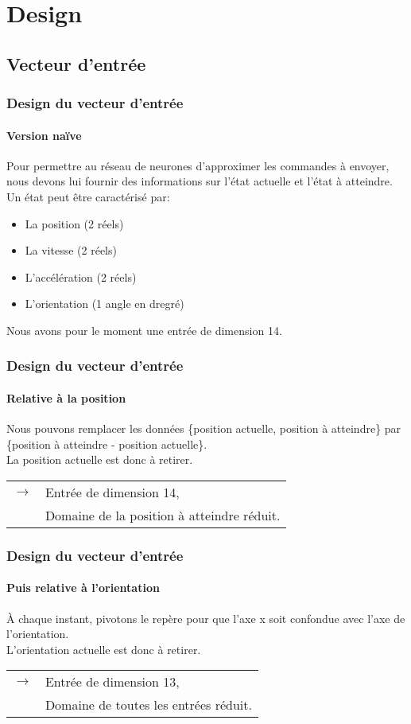 \section{Design}
\subsection{Vecteur d'entrée}

\begin{frame}
 \frametitle{Design du vecteur d'entrée}
 \framesubtitle{Version naïve}
 Pour permettre au réseau de neurones d'approximer les commandes à envoyer, nous devons lui fournir des informations sur l'état actuelle et l'état à atteindre.\\
 \vspace{1cm}
 Un état peut être caractérisé par:
 \begin{itemize}
  \item La position (2 réels)
  \item La vitesse (2 réels)
  \item L'accélération (2 réels)
  \item L'orientation (1 angle en dregré)
 \end{itemize}
 Nous avons pour le moment une entrée de dimension 14.
\end{frame}

\begin{frame}
 \frametitle{Design du vecteur d'entrée}
 \framesubtitle{Relative à la position}
 Nous pouvons remplacer les données \{position actuelle, position à atteindre\} par \{position à atteindre - position actuelle\}.\\
 La position actuelle est donc à retirer.\\
 \vspace{0.5cm}
 \begin{center}
 \begin{tabular}{ll}
  $\rightarrow$ & Entrée de dimension 14,\\
   & Domaine de la position à atteindre réduit.
 \end{tabular}
 \end{center}
\end{frame}

\begin{frame}
 \frametitle{Design du vecteur d'entrée}
 \framesubtitle{Puis relative à l'orientation}
 À chaque instant, pivotons le repère pour que l'axe x soit confondue avec l'axe de l'orientation.\\
 L'orientation actuelle est donc à retirer.\\
 \vspace{0.5cm}
 \begin{center}
 \begin{tabular}{ll}
  $\rightarrow$ & Entrée de dimension 13,\\
   & Domaine de toutes les entrées réduit.
 \end{tabular}
 \end{center}
\end{frame}

